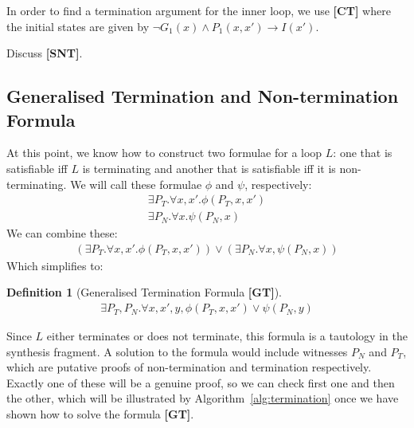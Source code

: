 \documentclass[preprint]{sigplanconf}
\theoremstyle{definition}
\newtheorem{definition}[theorem]{Definition}
\begin{document}
In order to find a termination argument for the inner loop, we use {\bf [CT]} where the initial states are given by 
$\neg G_1(x) \wedge P_1(x,x') \rightarrow I(x')$.


Discuss {\bf [SNT]}.\\

\fi

\subsection{Generalised Termination and Non-termination Formula}

At this point, we know how to construct two formulae for a loop $L$: one
that is satisfiable iff $L$ is terminating and another that is satisfiable
iff it is non-terminating.  We will call these formulae $\phi$ and $\psi$,
respectively:
%
\begin{align*}
 \exists P_T . \forall x, x' . \phi(P_T, x, x') \\
 \exists P_N . \forall x . \psi(P_N, x)
\end{align*}
%
We can combine these:
%
\begin{align*}
 (\exists P_T . \forall x, x'. \phi(P_T, x, x')) \vee (\exists P_N . \forall x, \psi(P_N, x))
\end{align*}
%
Which simplifies to:
\begin{definition}[Generalised Termination Formula {\bf [GT]}]
\label{def:general-termination}
\begin{align*}
 \exists P_T, P_N. \forall x, x', y, \phi(P_T, x, x') \vee \psi(P_N, y)
\end{align*}
\end{definition}

Since $L$ either terminates or does not terminate, this formula is a tautology in the synthesis fragment.
A solution to the formula would include witnesses $P_N$ and $P_T$, which are putative proofs of non-termination
and termination respectively.  Exactly one of these will be a genuine proof, so we can check
first one and then the other, which will be illustrated by Algorithm~\ref{alg:termination} once
we have shown how to solve the formula {\bf [GT]}.


% 
% 
\end{document}
